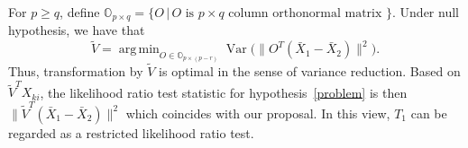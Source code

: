 \documentclass[review]{elsarticle}
\DeclareMathOperator{\myVar}{Var}
\theoremstyle{plain}
\theoremstyle{definition}
\newtheorem{remark}{\quad\quad Remark}
\theoremstyle{remark}
\begin{document}
    For $p\geq q$, define
    $
\mathbb{O}_{p\times q}=\{O\,|\, \textrm{$O$ is $p\times q$ column orthonormal matrix }\}$.
Under null hypothesis, we have that
$$
\tilde{V}=\mathop{\operatorname{arg\,min}}_{O\in\mathbb{O}_{p\times(p-r)}}\myVar\big(\|O^T(\bar{X}_1-\bar{X}_2)\|^2\big).
$$
Thus, transformation by $\tilde{V}$ is optimal in the sense of variance reduction.
 Based on $\tilde{V}^T X_{ki}$, the likelihood ratio test statistic for hypothesis~\eqref{problem} is then
    $\|\tilde{V}^T (\bar{X}_1-\bar{X}_2)\|^2$ which coincides with our proposal.
    In this view, $T_1$ can be regarded as a restricted likelihood ratio test.





\end{document}
